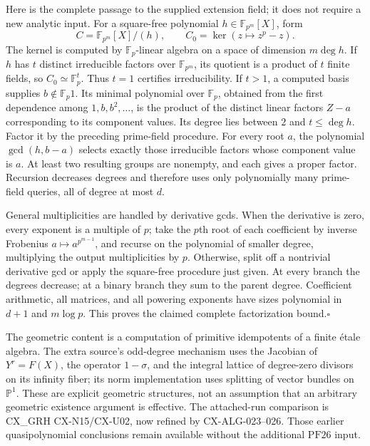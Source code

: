 \documentclass[11pt,a4paper]{article}
\begin{document}
Here is the complete passage to the supplied extension field; it
does not require a new analytic input. For a square-free polynomial
$h\in\mathbb F_{p^m}[X]$, form
\[
 C=\mathbb F_{p^m}[X]/(h),\qquad
 C_0=\ker(z\mapsto z^p-z).
\]
The kernel is computed by $\mathbb F_p$-linear algebra on a space
of dimension $m\deg h$. If $h$ has $t$ distinct irreducible
factors over $\mathbb F_{p^m}$, its quotient is a product of
$t$ finite fields, so $C_0\simeq\mathbb F_p^t$. Thus $t=1$
certifies irreducibility. If $t>1$, a computed basis supplies
$b\notin\mathbb F_p1$. Its minimal polynomial over
$\mathbb F_p$, obtained from the first dependence among
$1,b,b^2,\ldots$, is the product of the distinct linear factors
$Z-a$ corresponding to its component values. Its degree lies
between $2$ and $t\le\deg h$. Factor it by the preceding
prime-field procedure. For every root $a$, the polynomial
$\gcd(h,b-a)$ selects exactly those irreducible factors whose
component value is $a$. At least two resulting groups are nonempty,
and each gives a proper factor. Recursion decreases degrees and
therefore uses only polynomially many prime-field queries, all of
degree at most $d$.

General multiplicities are handled by derivative gcds. When the
derivative is zero, every exponent is a multiple of $p$; take the
$p$th root of each coefficient by inverse Frobenius
$a\mapsto a^{p^{m-1}}$, and recurse on the polynomial of smaller
degree, multiplying the output multiplicities by $p$. Otherwise,
split off a nontrivial derivative gcd or apply the square-free
procedure just given. At every branch the degrees decrease; at a
binary branch they sum to the parent degree. Coefficient arithmetic,
all matrices, and all powering exponents have sizes polynomial in
$d+1$ and $m\log p$. This proves the claimed complete
factorization bound.\hfill$\square$

The geometric content is a computation of primitive idempotents of a
finite \mbox{\'etale} algebra. The extra source's odd-degree mechanism
uses the Jacobian of $Y^r=F(X)$, the operator $1-\sigma$, and the
integral lattice of degree-zero divisors on its infinity fiber; its
norm implementation uses splitting of vector bundles on
$\mathbb P^1$. These are explicit geometric structures, not an
assumption that an arbitrary geometric existence argument is effective.
The attached-run comparison is CX\_GRH CX-N15/CX-U02, now refined by
CX-ALG-023--026. Those earlier quasipolynomial conclusions remain
available without the additional $\mathrm{PF26}$ input.
\end{document}
